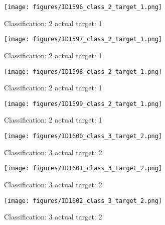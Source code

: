 \begin{figure}[h!]
\begin{center}
\texttt{[image: figures/ID1596\_class\_2\_target\_1.png]}
\end{center}
\caption{ Classification: 2 actual target: 1}
\label{fig:ID1596_class_2_target_1}
\end{figure}
\begin{figure}[h!]
\begin{center}
\texttt{[image: figures/ID1597\_class\_2\_target\_1.png]}
\end{center}
\caption{ Classification: 2 actual target: 1}
\label{fig:ID1597_class_2_target_1}
\end{figure}
\begin{figure}[h!]
\begin{center}
\texttt{[image: figures/ID1598\_class\_2\_target\_1.png]}
\end{center}
\caption{ Classification: 2 actual target: 1}
\label{fig:ID1598_class_2_target_1}
\end{figure}
\begin{figure}[h!]
\begin{center}
\texttt{[image: figures/ID1599\_class\_2\_target\_1.png]}
\end{center}
\caption{ Classification: 2 actual target: 1}
\label{fig:ID1599_class_2_target_1}
\end{figure}
\begin{figure}[h!]
\begin{center}
\texttt{[image: figures/ID1600\_class\_3\_target\_2.png]}
\end{center}
\caption{ Classification: 3 actual target: 2}
\label{fig:ID1600_class_3_target_2}
\end{figure}
\begin{figure}[h!]
\begin{center}
\texttt{[image: figures/ID1601\_class\_3\_target\_2.png]}
\end{center}
\caption{ Classification: 3 actual target: 2}
\label{fig:ID1601_class_3_target_2}
\end{figure}
\begin{figure}[h!]
\begin{center}
\texttt{[image: figures/ID1602\_class\_3\_target\_2.png]}
\end{center}
\caption{ Classification: 3 actual target: 2}
\label{fig:ID1602_class_3_target_2}
\end{figure}
